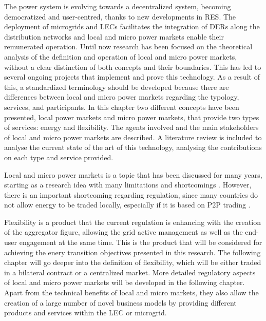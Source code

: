 The power system is evolving towards a decentralized system, becoming democratized and user-centred, thanks to new developments in RES. The deployment of microgrids and LECs facilitates the integration of DERs along the distribution networks and local and micro power markets enable their remunerated operation. Until now research has been focused on the theoretical analysis of the definition and operation of local and micro power markets, without a clear distinction of both concepts and their boundaries. This has led to several ongoing projects that implement and prove this technology. As a result of this, a standardized terminology should be developed because there are differences between local and micro power markets regarding the typology, services, and participants.
In this chapter two different concepts have been presented, local power markets and micro power markets, that provide two types of services: energy and flexibility. The agents involved and the main stakeholders of local and micro power markets are described. A literature review is included to analyse the current state of the art of this technology, analysing the contributions on each type and service provided.

Local and micro power markets is a topic that has been discussed for many years, starting as a research idea with many limitations and shortcomings \cite{wu1999coordinated, blouin2001decentralized, lund2006integrated, alibhai2004distributed}. However, there is an important shortcoming regarding regulation, since many countries do not allow energy to be traded locally, especially if it is based on P2P trading \cite{DesignElectricityMarketRossetoo2017}. 

Flexibility is a product that the current regulation is enhancing with the creation of the aggregator figure, allowing the grid active management as well as the end-user engagement at the same time. This is the product that will be considered for achieving the enery transition objectives presented in this research. The following chapter will go deeper into the definition of flexibility, which will be either traded in a bilateral contract or a centralized market. More detailed regulatory aspects of local and micro power markets will be developed in the following chapter. Apart from the technical benefits of local and micro markets, they also allow the creation of a large number of novel business models by providing different products and services within the LEC or microgrid. 
	


